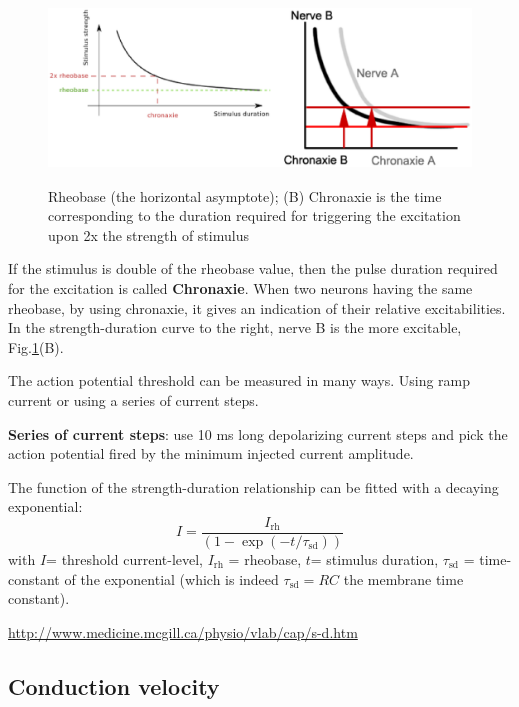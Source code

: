 \begin{figure}[hbt]
  \centerline{\includegraphics[height=5cm,
    angle=0]{./images/rheobase-chronaxie.eps}}
 \caption{Rheobase (the horizontal asymptote); (B) Chronaxie is the time
 corresponding to the duration required for triggering the excitation upon 2x
 the strength of stimulus}
\label{fig:rheobase}
\end{figure}

If the stimulus is double of the rheobase value, then the pulse duration
required for the excitation is called {\bf Chronaxie}.
When two neurons having the same rheobase, by using chronaxie, it gives an
indication of their relative excitabilities.  In the strength-duration curve to
the right, nerve B is the more excitable, Fig.\ref{fig:rheobase}(B).

\begin{mdframed}
The action potential threshold can be measured in many ways. Using ramp current
or using a series of current steps.

{\bf Series of current steps}: use 10 ms long depolarizing current steps and
pick the action potential fired by the minimum injected current amplitude. 
\end{mdframed}

The function of the strength-duration relationship can be fitted with
a decaying exponential:
\def\rh{{\text{rh}}} 
\def\sd{{\text{sd}}}
\begin{equation}
I = \frac{I_\rh}{\left( 1- \exp(-t/\tau_\sd) \right)}
\end{equation}
with $I$= threshold current-level, $I_\rh$ = rheobase, $t$= stimulus duration,
$\tau_\sd$ = time-constant of the exponential (which is indeed $\tau_\sd=RC$
the membrane time constant).

\url{http://www.medicine.mcgill.ca/physio/vlab/cap/s-d.htm}

\subsection{Conduction velocity}
\label{sec:conduction-velocity}

